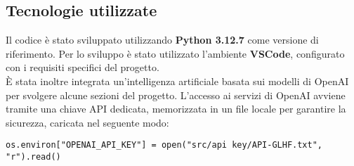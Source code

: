 \documentclass[12pt]{article}
\begin{document}
	\subsection{Tecnologie utilizzate}
Il codice è stato sviluppato utilizzando \textbf{Python 3.12.7} come versione di riferimento. Per lo sviluppo è stato utilizzato l'ambiente \textbf{VSCode}, configurato con i requisiti specifici del progetto.\\
È stata inoltre integrata un'intelligenza artificiale basata sui modelli di OpenAI per svolgere alcune sezioni del progetto. L'accesso ai servizi di OpenAI avviene tramite una chiave API dedicata, memorizzata in un file locale per garantire la sicurezza, caricata nel seguente modo:
	\begin{lstlisting}
os.environ["OPENAI_API_KEY"] = open("src/api key/API-GLHF.txt", "r").read()
	\end{lstlisting}
	
\end{document}

